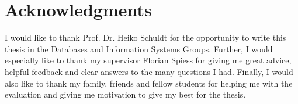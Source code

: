 \chapter{Acknowledgments}
I would like to thank Prof. Dr. Heiko Schuldt for the opportunity to write this thesis in the Databases and Information Systems Groups. Further, I would especially like to thank my supervisor Florian Spiess for giving me great advice, helpful feedback and clear answers to the many questions I had. Finally, I would also like to thank my family, friends and fellow students for helping me with the evaluation and giving me motivation to give my best for the thesis.
